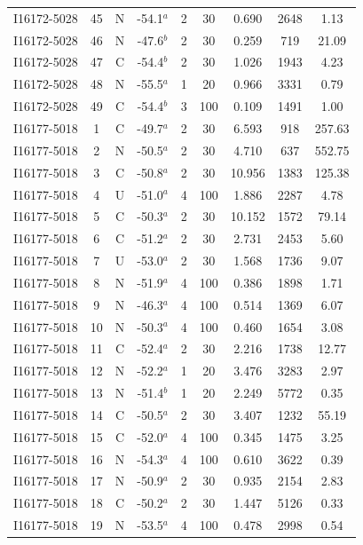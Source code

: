 \begin{table}
\begin{tabular}{ccccccccc}
I16172-5028 & 45 & N & -54.1$^{a}$ & 2 & 30 & 0.690 & 2648 & 1.13 \\
I16172-5028 & 46 & N & -47.6$^{b}$ & 2 & 30 & 0.259 & 719 & 21.09 \\
I16172-5028 & 47 & C & -54.4$^{b}$ & 2 & 30 & 1.026 & 1943 & 4.23 \\
I16172-5028 & 48 & N & -55.5$^{a}$ & 1 & 20 & 0.966 & 3331 & 0.79 \\
I16172-5028 & 49 & C & -54.4$^{b}$ & 3 & 100 & 0.109 & 1491 & 1.00 \\
I16177-5018 & 1 & C & -49.7$^{a}$ & 2 & 30 & 6.593 & 918 & 257.63 \\
I16177-5018 & 2 & N & -50.5$^{a}$ & 2 & 30 & 4.710 & 637 & 552.75 \\
I16177-5018 & 3 & C & -50.8$^{a}$ & 2 & 30 & 10.956 & 1383 & 125.38 \\
I16177-5018 & 4 & U & -51.0$^{a}$ & 4 & 100 & 1.886 & 2287 & 4.78 \\
I16177-5018 & 5 & C & -50.3$^{a}$ & 2 & 30 & 10.152 & 1572 & 79.14 \\
I16177-5018 & 6 & C & -51.2$^{a}$ & 2 & 30 & 2.731 & 2453 & 5.60 \\
I16177-5018 & 7 & U & -53.0$^{a}$ & 2 & 30 & 1.568 & 1736 & 9.07 \\
I16177-5018 & 8 & N & -51.9$^{a}$ & 4 & 100 & 0.386 & 1898 & 1.71 \\
I16177-5018 & 9 & N & -46.3$^{a}$ & 4 & 100 & 0.514 & 1369 & 6.07 \\
I16177-5018 & 10 & N & -50.3$^{a}$ & 4 & 100 & 0.460 & 1654 & 3.08 \\
I16177-5018 & 11 & C & -52.4$^{a}$ & 2 & 30 & 2.216 & 1738 & 12.77 \\
I16177-5018 & 12 & N & -52.2$^{a}$ & 1 & 20 & 3.476 & 3283 & 2.97 \\
I16177-5018 & 13 & N & -51.4$^{b}$ & 1 & 20 & 2.249 & 5772 & 0.35 \\
I16177-5018 & 14 & C & -50.5$^{a}$ & 2 & 30 & 3.407 & 1232 & 55.19 \\
I16177-5018 & 15 & C & -52.0$^{a}$ & 4 & 100 & 0.345 & 1475 & 3.25 \\
I16177-5018 & 16 & N & -54.3$^{a}$ & 4 & 100 & 0.610 & 3622 & 0.39 \\
I16177-5018 & 17 & N & -50.9$^{a}$ & 2 & 30 & 0.935 & 2154 & 2.83 \\
I16177-5018 & 18 & C & -50.2$^{a}$ & 2 & 30 & 1.447 & 5126 & 0.33 \\
I16177-5018 & 19 & N & -53.5$^{a}$ & 4 & 100 & 0.478 & 2998 & 0.54 \\

\end{tabular}
\end{table}
